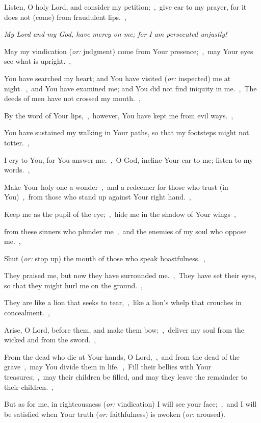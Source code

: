 \documentclass[12pt,twoside,a5paper]{article}
\newcommand{\qanona}[1]{{\liturgicalhint{Qanona.} \emph{#1}}}
\newcommand{\translationoption}[1]{\emph{or:} #1}
\begin{document}
\begin{normalparskip}
  Listen, O holy Lord, and consider my petition;~\sep\ give ear to my prayer, for it does not (come) from fraudulent lips.~\sep

  \qanona{My Lord and my God, have mercy on me; for I am persecuted unjustly!}

  May my vindication (\translationoption{judgment}) come from Your presence;~\sep\ may Your eyes see what is upright.~\sep

  You have searched my heart; and You have visited (\translationoption{inspected}) me at night.~\sep\ and You have examined me; and You did not find iniquity in me.~\sep\ The deeds of men have not crossed my mouth.~\sep

  By the word of Your lips,~\sep\ however, You have kept me from evil ways.~\sep

  You have sustained my walking in Your paths, so that my footsteps might not totter.~\sep

  I cry to You, for You answer me.~\sep\ O God, incline Your ear to me; listen to my words.~\sep

  Make Your holy one a wonder~\sep\ and a redeemer for those who trust (in You)~\sep\ from those who stand up against Your right hand.~\sep

  Keep me as the pupil of the eye;~\sep\ hide me in the shadow of Your wings~\sep

  from these sinners who plunder me~\sep\ and the enemies of my soul who oppose me.~\sep

  Shut (\translationoption{stop up}) the mouth of those who speak boastfulness.~\sep

  They praised me, but now they have surrounded me.~\sep\ They have set their eyes, so that they might hurl me on the ground.~\sep

  They are like a lion that seeks to tear,~\sep\ like a lion’s whelp that crouches in concealment.~\sep

  Arise, O Lord, before them, and make them bow;~\sep\ deliver my soul from the wicked and from the sword.~\sep

  From the dead who die at Your hands, O Lord,~\sep\ and from the dead of the grave~\sep\ may You divide them in life.~\sep\ Fill their bellies with Your treasures;~\sep\ may their children be filled, and may they leave the remainder to their children.~\sep

  But as for me, in righteousness (\translationoption{vindication}) I will see your face;~\sep\ and I will be satisfied when Your truth (\translationoption{faithfulness}) is awoken (\translationoption{aroused}).
\end{normalparskip}
\end{document}
